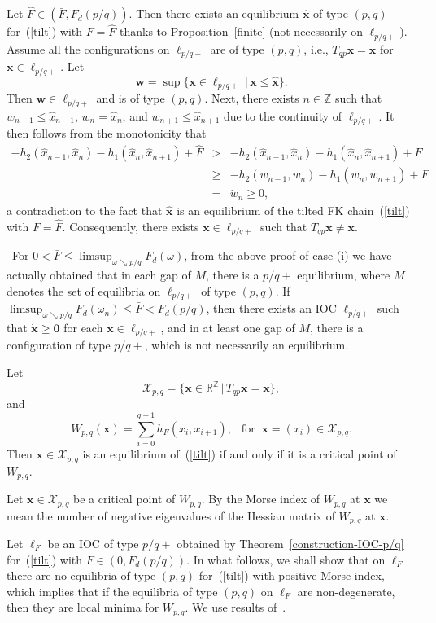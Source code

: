 \documentclass[12pt]{article}
\newcommand{\R}{\mathbb{R}}
\newcommand{\Z}{\mathbb{Z}}
\newcounter{number}
\newcommand{\emark}{\hfill\hspace{1em}\framebox[0.5em]{\rule{0cm}{0em}}
\vspace{2mm}}
\newcommand{\refer}[1]{~(\ref{#1})}
\newcommand{\wbf}{{\mathbf{w}}}
\newcommand{\xbf}{{\mathbf{x}}}
\newcommand{\zero}{{\mathbf{0}}}
\newcommand{\mcalX}{\mathcal{X}}
\begin{document}
Let $\hat{F} \in (\bar{F}, F_d(p/q))$. Then there exists an equilibrium $\hat{\xbf}$ of type $(p,q)$ for\refer{tilt} with $F=\hat{F}$ thanks to Proposition~\ref{finite} (not necessarily on $\ell_{p/q+}$). Assume all the configurations on $\ell_{p/q+}$ are of type $(p,q)$, i.e., $T_{qp}\xbf=\xbf$ for $\xbf\in\ell_{p/q+}$. Let
$$
\wbf=\sup\{\xbf\in\ell_{p/q+}\,|\,\xbf\leq\hat{\xbf}\}.
$$
Then $\wbf\in\ell_{p/q+}$ and is of type $(p,q)$. Next, there exists $n\in\Z$ such that
$w_{n-1}\leq \hat{x}_{n-1}$, $w_n=\hat{x}_n$, and $w_{n+1}\leq \hat{x}_{n+1}$ due to the continuity of $\ell_{p/q+}$.
It then follows from  the monotonicity that
$$
\begin{array}{lll}
-h_2(\hat{x}_{n-1},\hat{x}_n)-h_1(\hat{x}_n,\hat{x}_{n+1})+\hat{F}& > & -h_2(\hat{x}_{n-1},\hat{x}_n)-h_1(\hat{x}_n,\hat{x}_{n+1})+\bar{F}\\[4pt]
 & \geq & -h_2(w_{n-1},w_n)-h_1(w_n,w_{n+1})+\bar{F}\\[4pt]
  &= &\dot{w}_n\geq 0,
 \end{array}
$$
 a contradiction to the fact that $\hat{\xbf}$ is an equilibrium of the tilted FK chain\refer{tilt} with $F=\hat{F}$. Consequently, there exists $\xbf\in\ell_{p/q+}$ such that $T_{qp}\xbf\neq \xbf$.
\emark

\ For $0< \bar{F}\leq \limsup_{\omega\searrow p/q}F_d(\omega)$, from the above proof of case (i) we have actually obtained that in each gap of $M$, there is a $p/q+$ equilibrium, where $M$ denotes the set of equilibria on $\ell_{p/q+}$ of type $(p,q)$. If $\limsup_{\omega\searrow p/q}F_d(\omega_n)\leq \bar{F}<F_d(p/q)$, then there exists an IOC $\ell_{p/q+}$ such that $\dot{\xbf}\geq\zero$ for each $\xbf\in\ell_{p/q+}$, and in at least one gap of $M$, there is a configuration of type $p/q+$, which is not necessarily an equilibrium.

\vspace{2mm}

Let
$$
\mcalX_{p,q}=\{\xbf\in\R^\Z\,|\, T_{qp}\xbf=\xbf\},
$$
and
$$
W_{p,q}(\xbf)=\sum_{i=0}^{q-1}h_F(x_i,x_{i+1}),\ \ \mbox{ for }\ \xbf=(x_i)\in\mcalX_{p,q}.
$$
Then $\xbf\in\mcalX_{p,q}$ is an equilibrium of\refer{tilt} if and only if it is a critical point of $W_{p,q}$.

Let $\xbf\in\mcalX_{p,q}$ be a  critical point of $W_{p,q}$. By the Morse index of $W_{p,q}$ at $\xbf$ we mean the number of negative eigenvalues of the Hessian matrix of $W_{p,q}$ at $\xbf$.

Let $\ell_F$ be an IOC of type $p/q+$ obtained by Theorem~\ref{construction-IOC-p/q} for\refer{tilt} with $F\in (0,F_d(p/q))$. In what follows, we shall show that on $\ell_F$ there are no  equilibria of type $(p,q)$ for\refer{tilt} with positive Morse index, which implies that if the equilibria of type $(p,q)$ on $\ell_F$ are non-degenerate, then they are local minima for $W_{p,q}$. We use results of~\cite{An1}.
\end{document}
